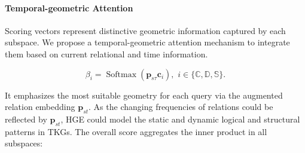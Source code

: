 \documentclass[letterpaper]{article} %
\begin{document}
\paragraph{Temporal-geometric Attention}
Scoring vectors represent distinctive geometric information captured by each subspace. We propose a temporal-geometric attention mechanism to integrate them based on current relational and time information.

\begin{equation}
\beta_{i}=\operatorname{Softmax}\left(\boldsymbol{p}_{s\tau} \boldsymbol{c}_i \right), \,\, i \in \{\mathbb{C}, \mathbb{D}, \mathbb{S}\}.
\label{eq:temporalAttention3}
\end{equation}



It emphasizes the most suitable geometry for each query via the augmented relation embedding $\boldsymbol{p}_{st}$. As the changing frequencies of relations could be reflected by $\boldsymbol{p}_{st}$, HGE could model the static and dynamic logical and structural patterns in TKGs.
The overall score aggregates the inner product in all subspaces:
\end{document}
